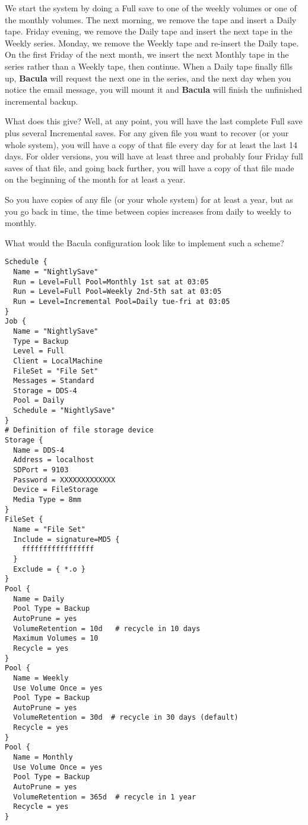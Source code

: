 We start the system by doing a Full save to one of the weekly volumes or one
of the monthly volumes. The next morning, we remove the tape and insert a
Daily tape. Friday evening, we remove the Daily tape and insert the next tape
in the Weekly series. Monday, we remove the Weekly tape and re-insert the
Daily tape. On the first Friday of the next month, we insert the next Monthly
tape in the series rather than a Weekly tape, then continue. When a Daily tape
finally fills up, {\bf Bacula} will request the next one in the series, and
the next day when you notice the email message, you will mount it and {\bf
Bacula} will finish the unfinished incremental backup. 

What does this give? Well, at any point, you will have the last complete
Full save plus several Incremental saves. For any given file you want to
recover (or your whole system), you will have a copy of that file every day
for at least the last 14 days. For older versions, you will have at least three
and probably four Friday full saves of that file, and going back further, you
will have a copy of that file made on the beginning of the month for at least
a year. 

So you have copies of any file (or your whole system) for at least a year, but
as you go back in time, the time between copies increases from daily to weekly
to monthly. 

What would the Bacula configuration look like to implement such a scheme? 

\footnotesize
\begin{verbatim}
Schedule {
  Name = "NightlySave"
  Run = Level=Full Pool=Monthly 1st sat at 03:05
  Run = Level=Full Pool=Weekly 2nd-5th sat at 03:05
  Run = Level=Incremental Pool=Daily tue-fri at 03:05
}
Job {
  Name = "NightlySave"
  Type = Backup
  Level = Full
  Client = LocalMachine
  FileSet = "File Set"
  Messages = Standard
  Storage = DDS-4
  Pool = Daily
  Schedule = "NightlySave"
}
# Definition of file storage device
Storage {
  Name = DDS-4
  Address = localhost
  SDPort = 9103
  Password = XXXXXXXXXXXXX
  Device = FileStorage
  Media Type = 8mm
}
FileSet {
  Name = "File Set"
  Include = signature=MD5 {
    fffffffffffffffff
  }
  Exclude = { *.o }
}
Pool {
  Name = Daily
  Pool Type = Backup
  AutoPrune = yes
  VolumeRetention = 10d   # recycle in 10 days
  Maximum Volumes = 10
  Recycle = yes
}
Pool {
  Name = Weekly
  Use Volume Once = yes
  Pool Type = Backup
  AutoPrune = yes
  VolumeRetention = 30d  # recycle in 30 days (default)
  Recycle = yes
}
Pool {
  Name = Monthly
  Use Volume Once = yes
  Pool Type = Backup
  AutoPrune = yes
  VolumeRetention = 365d  # recycle in 1 year
  Recycle = yes
}
\end{verbatim}
\normalsize

